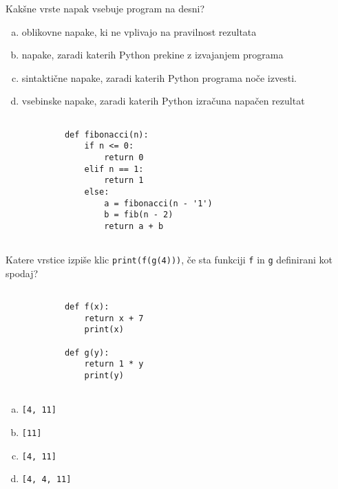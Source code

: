 \documentclass[arhiv, 10pt]{../izpit}
\newcommand{\inlinepy}[1]{\texttt{#1}}
\begin{document}
        \naloga*
        \begin{multicols}{2}
        \noindent
        Kakšne vrste napak vsebuje program na desni?

        \begin{enumerate}[(a)]
\item oblikovne napake, ki ne vplivajo na pravilnost rezultata
\item napake, zaradi katerih Python prekine z izvajanjem programa
\item sintaktične napake, zaradi katerih Python programa noče izvesti.
\item vsebinske napake, zaradi katerih Python izračuna napačen rezultat
\end{enumerate}

        \columnbreak

        \begin{verbatim}
        
            def fibonacci(n):
                if n <= 0:
                    return 0
                elif n == 1:
                    return 1
                else:
                    a = fibonacci(n - '1')
                    b = fib(n - 2)
                    return a + b
            
        \end{verbatim}

        \end{multicols}

    
        \naloga*
        Katere vrstice izpiše klic \inlinepy{print(f(g(4)))}, če sta funkciji \inlinepy{f} in \inlinepy{g} definirani kot spodaj?

        \begin{multicols}{2}
        \begin{verbatim}
        
            def f(x):
                return x + 7
                print(x)

            def g(y):
                return 1 * y
                print(y)
        
        \end{verbatim}

        \begin{enumerate}[(a)]
\item \inlinepy{[4, 11]}
\item \inlinepy{[11]}
\item \inlinepy{[4, 11]}
\item \inlinepy{[4, 4, 11]}
\end{enumerate}

        \end{multicols}
    
\end{document}
